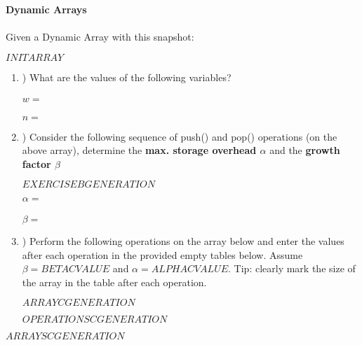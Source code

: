 \documentclass[12pt]{article}
\begin{document}
    \textbf{\LARGE{\color{tumgadPurple} Dynamic Arrays}}\\
    \\
    \noindent
    Given a Dynamic Array with this snapshot:
    \begin{center}
        $INITARRAY$
    \end{center}
    \begin{enumerate}[label=\alph*]
        \item \hspace{-5px}) What are the values of the following variables?\\
        \\
        $w = $\\
        \\
        $n = $
        \\
        \item \hspace{-5px}) Consider the following sequence of push() and pop() operations (on the above array), determine the \textbf{max. storage overhead $\alpha$}
        and the \textbf{growth factor $\beta$}
        \begin{center}
            $EXERCISEBGENERATION$
        \end{center}
        $\alpha = $\\
        \\
        $\beta = $\\
        \item \hspace{-5px}) Perform the following operations on the array below and enter the values after each operation in the provided empty
        tables below. Assume $\beta = BETACVALUE$ and $\alpha = ALPHACVALUE$. Tip: clearly mark the size of the array in the table after each operation.
        \begin{center}
            $ARRAYCGENERATION$
        \end{center}
        $OPERATIONSCGENERATION$
    \end{enumerate}
    \begin{center}
        $ARRAYSCGENERATION$
    \end{center}
\end{document}
